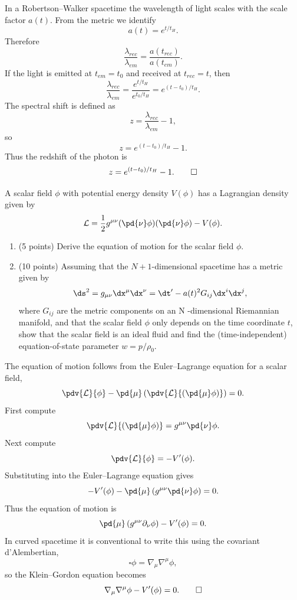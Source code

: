 \begin{solution}[(iii)]
  In a Robertson--Walker spacetime the wavelength of light scales with the scale factor $a(t)$. From the metric we identify
  \[%
    a(t) = e^{t/t_H}
  .\]%
  Therefore
  \[%
    \frac{\lambda_{rec}}{\lambda_{em}} = \frac{a(t_{rec})}{a(t_{em})}
  .\]%
  If the light is emitted at $t_{em} = t_0$ and received at $t_{rec} = t$, then
  \[%
    \frac{\lambda_{rec}}{\lambda_{em}} = \frac{e^{t/t_H}}{e^{t_0/t_H}} = e^{(t-t_0)/t_H}
  .\]%
  The spectral shift is defined as
  \[%
    z = \frac{\lambda_{rec}}{\lambda_{em}} - 1
  ,\]%
  so
  \[%
    z = e^{(t-t_0)/t_H} - 1
  .\]%
  Thus the redshift of the photon is
  \[%
    z = e^{(t - t_0)/t_H} - 1
  .\qedhere\]%
\end{solution}

\begin{problem}[2]
  A scalar field $\phi$ with potential energy density $V(\phi)$ has a Lagrangian density given by
  \[%
    \L = \frac{1}{2}g^{\mu\nu}(\pd{\nu}\phi)(\pd{\nu}\phi) - V(\phi)
  .\]%
  \begin{enumerate}
    \item (5 points) Derive the equation of motion for the scalar field $\phi$.
    \item (10 points) Assuming that the $N + 1$-dimensional spacetime has a metric given by
      \[%
        \ds^2 = g_{\mu\nu}\dx^\mu\dx^\nu = \dt' - a(t)^2G_{ij}\dx^i\dx^j
      ,\]%
      where $G_{ij}$ are the metric components on an N -dimensional Riemannian manifold, and that the scalar field $\phi$ only depends on the time coordinate $t$, show that the scalar field is an ideal fluid and find the (time-independent) equation-of-state parameter $w = p/\rho_0$.
  \end{enumerate}
\end{problem}

\begin{solution}[(i)]
  The equation of motion follows from the Euler--Lagrange equation for a scalar field,
  \[%
    \pdv{\L}{\phi} - \pd{\mu}\left(\pdv{\L}{(\pd{\mu}\phi)}\right) = 0
  .\]%
  First compute
  \[%
    \pdv{\L}{(\pd{\mu}\phi)} = g^{\mu\nu}\pd{\nu} \phi
  .\]%
  Next compute
  \[%
    \pdv{\L}{\phi} = -V'(\phi)
  .\]%
  Substituting into the Euler--Lagrange equation gives
  \[%
    -V'(\phi) - \pd{\mu}\left(g^{\mu\nu}\pd{\nu}\phi\right) = 0
  .\]%
  Thus the equation of motion is
  \[%
    \pd{\mu}\left(g^{\mu\nu}\partial_\nu\phi\right) - V'(\phi) = 0
  .\]%
  In curved spacetime it is conventional to write this using the covariant d'Alembertian,
  \[%
    \square \phi = \nabla_\mu\nabla^\mu \phi
  ,\]%
  so the Klein--Gordon equation becomes
  \[%
    \nabla_\mu\nabla^\mu \phi - V'(\phi) = 0
  .\qedhere\]%
\end{solution}

